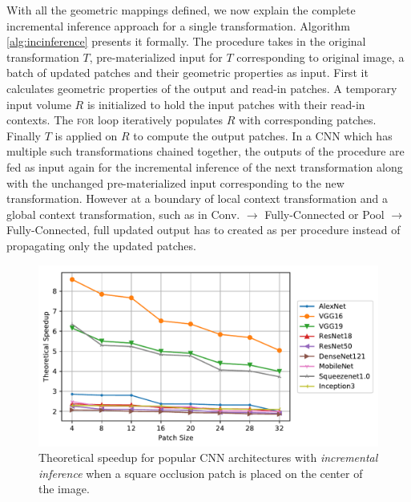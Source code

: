 With all the geometric mappings defined, we now explain the complete incremental inference approach for a single transformation. Algorithm \ref{alg:incinference} presents it formally.
The  procedure takes in the original transformation $T$, pre-materialized input for $T$ corresponding to original image, a batch of updated patches and their geometric properties as input.
First it calculates geometric properties of the output and read-in patches.
A temporary input volume $R$ is initialized to hold the input patches with their read-in contexts.
The \textsc{for} loop iteratively populates $R$ with corresponding patches.
Finally $T$ is applied on $R$ to compute the output patches.
In a CNN which has multiple such transformations chained together, the outputs of the  procedure are fed as input again for the incremental inference of the next transformation along with the unchanged pre-materialized input corresponding to the new transformation.
However at a boundary of local context transformation and a global context transformation, such as in Conv. $\rightarrow$ Fully-Connected or Pool $\rightarrow$ Fully-Connected, full updated output has to created as per  procedure instead of propagating only the updated patches.

\begin{figure}[t]
\includegraphics[width=\columnwidth]{images/redundancy_ratio}
\caption{Theoretical speedup for popular CNN architectures with \textit{incremental inference} when a square occlusion patch is placed on the center of the image.}
\label{fig:redundancy_ratio}
\end{figure}


